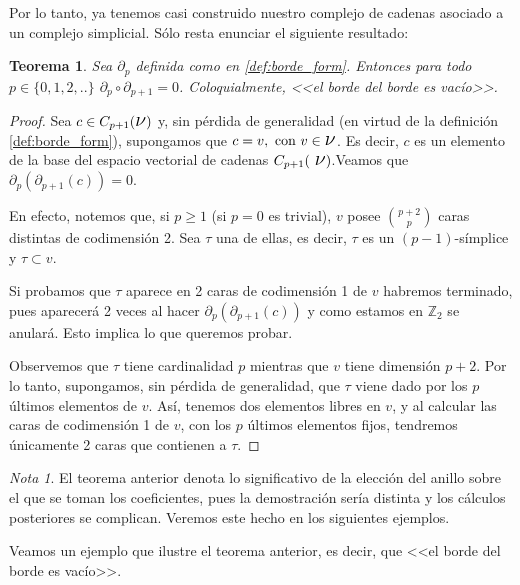 \documentclass[12pt, a4paper, twoside]{book}
\numberwithin{equation}{section}
\newtheorem{theorem}{Teorema}
\theoremstyle{definition}
\theoremstyle{remark}
\newtheorem*{remark}{Nota}
\theoremstyle{plain}
\begin{document}
	Por lo tanto, ya tenemos casi construido nuestro complejo de cadenas 
	asociado a un complejo simplicial. Sólo resta enunciar el siguiente 
	resultado:

	\begin{theorem}
		Sea $\partial_{p}$ definida como en \ref{def:borde_form}. 
		Entonces para todo $p \in \{0,1,2,..\}$ $\partial_{p}\circ 
		\partial_{p+1}=0$. Coloquialmente, <<el borde del borde es 
		vacío>>.
	\end{theorem}
	\begin{proof}
		Sea $c \in C_{p+1}(\text{{\Large $\nu$}})$ y, sin pérdida
		de generalidad (en virtud de la definición 
		\ref{def:borde_form}), supongamos que $c=v,\text{ con }v\in 
		\text{{\Large $\nu$}}$. Es decir, $c$ es un elemento de la 
		base del espacio vectorial de cadenas $C_{p+1}(\text{
		{\Large $\nu$}})$.Veamos que $\partial_{p}(
		\partial_{p+1}(c))=0$.

		En efecto, notemos que, si $p\geq1$ (si $p=0$ es trivial), $v$ 
		posee $\binom{p+2}{p}$ 
		caras distintas de codimensión 2. Sea $\tau$ una de ellas, es 
		decir, $\tau$ es un $(p-1)$-símplice y $\tau \subset v$.

		Si probamos que $\tau$ aparece en 2 caras de codimensión 1 de 
		$v$ habremos terminado, pues aparecerá 2 veces al 
		hacer $\partial_{p}(\partial_{p+1}(c))$ y como estamos en 
		$\mathbb{Z}_{2}$ se anulará. Esto implica lo que queremos
		probar.

		Observemos que $\tau$ tiene cardinalidad $p$ mientras que $v$ 
		tiene dimensión $p+2$. Por lo tanto, supongamos, sin pérdida 
		de generalidad, que $\tau$ viene dado por los $p$ últimos 
		elementos de $v$. Así, tenemos dos elementos libres en $v$, y 
		al calcular las caras de codimensión 1 de $v$, con los $p$ 
		últimos elementos fijos, tendremos únicamente 2 caras que 
		contienen a $\tau$.  	
	\end{proof}
	
	\begin{remark}
		El teorema anterior denota lo significativo de la elección del
		anillo sobre el que se toman los coeficientes, pues la 
		demostración sería distinta y los cálculos posteriores se 
		complican. Veremos este hecho en los siguientes ejemplos.
	\end{remark}

	Veamos un ejemplo que ilustre el teorema anterior, es decir, que 
	<<el borde del borde es vacío>>.
\end{document}
